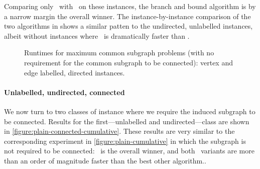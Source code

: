Comparing only \McSplit\ with \McSplitDown\ on these instances, the branch and bound
algorithm is by a narrow margin the overall winner.  The instance-by-instance
comparison of the two algorithms in  shows a similar patten
to the undirected, unlabelled instances, albeit without instances where \McSplitDown\
is dramatically faster than \McSplit.

\begin{figure}[h!]
    \centering
    \par\bigskip
    \caption{Runtimes for maximum
    common subgraph problems (with no requirement for the common subgraph
    to be connected): vertex and edge labelled, directed instances.}\label{figure:mcs-cumulative-labelled-not-connected}
\end{figure}









\paragraph{Unlabelled, undirected, connected}
We now turn to two classes of instance where we require the induced
subgraph to be connected.
Results for the first---unlabelled and undirected---class are shown
in \cref{figure:plain-connected-cumulative}.  These results are very similar to
the corresponding experiment in \cref{figure:plain-cumulative} in which the
subgraph is not required to be connected: \McSplitDown\ is the overall winner,
and both \McSplit\ variants are more than an order of magnitude faster than
the best other algorithm..

